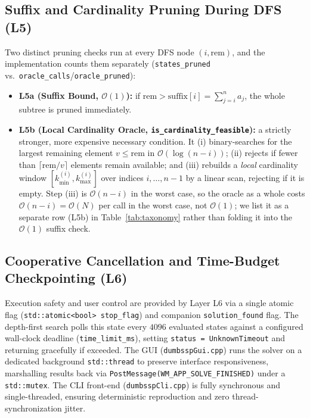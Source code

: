 \documentclass[journal,onecolumn,11pt]{IEEEtran}
\begin{document}
\subsection{Suffix and Cardinality Pruning During DFS (L5)}
Two distinct pruning checks run at every DFS node $(i,\text{rem})$, and the implementation counts them separately (\texttt{states\_pruned} vs.\ \texttt{oracle\_calls}/\texttt{oracle\_pruned}):
\begin{itemize}
    \item \textbf{L5a (Suffix Bound, $\mathcal{O}(1)$):} if $\text{rem} > \text{suffix}[i] = \sum_{j=i}^{n} a_j$, the whole subtree is pruned immediately.
    \item \textbf{L5b (Local Cardinality Oracle, \texttt{is\_cardinality\_feasible}):} a strictly stronger, more expensive necessary condition. It (i) binary-searches for the largest remaining element $v\le \text{rem}$ in $\mathcal{O}(\log(n-i))$; (ii) rejects if fewer than $\lceil \text{rem}/v\rceil$ elements remain available; and (iii) rebuilds a \emph{local} cardinality window $[k_{\min}^{(i)}, k_{\max}^{(i)}]$ over indices $i,\dots,n-1$ by a linear scan, rejecting if it is empty. Step (iii) is $\mathcal{O}(n-i)$ in the worst case, so the oracle as a whole costs $\mathcal{O}(n-i) = \mathcal{O}(N)$ per call in the worst case, not $\mathcal{O}(1)$; we list it as a separate row (L5b) in Table~\ref{tab:taxonomy} rather than folding it into the $\mathcal{O}(1)$ suffix check.
\end{itemize}

\subsection{Cooperative Cancellation and Time-Budget Checkpointing (L6)}
\label{sec:l6-cancellation}
Execution safety and user control are provided by Layer L6 via a single atomic flag (\texttt{std::atomic<bool> stop\_flag}) and companion \texttt{solution\_found} flag. The depth-first search polls this state every $4096$ evaluated states against a configured wall-clock deadline (\texttt{time\_limit\_ms}), setting \texttt{status = UnknownTimeout} and returning gracefully if exceeded. The GUI (\texttt{dumbsspGui.cpp}) runs the solver on a dedicated background \texttt{std::thread} to preserve interface responsiveness, marshalling results back via \texttt{PostMessage(WM\_APP\_SOLVE\_FINISHED)} under a \texttt{std::mutex}. The CLI front-end (\texttt{dumbsspCli.cpp}) is fully synchronous and single-threaded, ensuring deterministic reproduction and zero thread-synchronization jitter.
\end{document}
